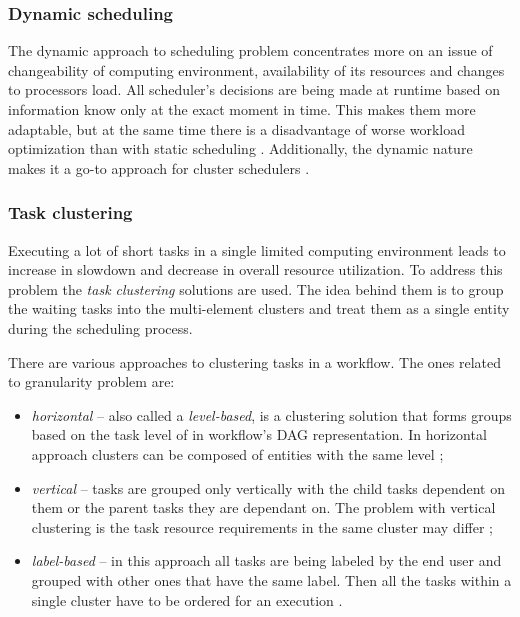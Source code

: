\subsubsection{Dynamic scheduling}
\label{s:ProblemDomain:DynamicSched}

The dynamic approach to scheduling problem concentrates more on an issue of changeability of computing environment, availability of its resources and changes to processors load.
All scheduler's decisions are being made at runtime based on information know only at the exact moment in time.
This makes them more adaptable, but at the same time there is a disadvantage of worse workload optimization than with static scheduling \cite{b:Dynamic-Scheduling-Case-Study}.
Additionally, the dynamic nature makes it a go-to approach for cluster schedulers \cite{b:Tetris, b:Graphene}.



\subsubsection{Task clustering}
\label{s:ProblemDomain:TaskClustering}

Executing a lot of short tasks in a single limited computing environment leads to increase in slowdown and decrease in overall resource utilization.
To address this problem the \emph{task clustering} solutions are used.
The idea behind them is to group the waiting tasks into the multi-element clusters and treat them as a single entity \cite{b:Task-Clustering-Pegasus} during the scheduling process.

There are various approaches to clustering tasks in a workflow.
The ones related to granularity problem are:


\begin{itemize}
  \item{
\emph{horizontal} -- also called a \emph{level-based}, is a clustering solution that forms groups based on the task level of in workflow's DAG representation. In horizontal approach clusters can be composed of entities with the same level
};
\item{
\emph{vertical} -- tasks are grouped only vertically with the child tasks dependent on them or the parent tasks they are dependant on. The problem with vertical clustering is the task resource requirements in the same cluster may differ
};
  \item{
\emph{label-based} -- in this approach all tasks are being labeled by the end user and grouped with other ones that have the same label. Then all the tasks within a single cluster have to be ordered for an execution \cite{b:Task-Clustering-Hybrid-Algorithm, b:Task-Clustering-Pegasus}.
}
\end{itemize}



